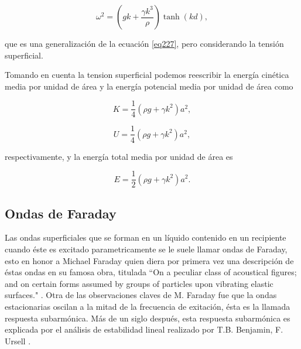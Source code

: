 \begin{equation}\label{eq255}
    \omega^2 = \left(g k + \frac{\gamma k^3}{\rho}\right) \tanh(kd),
\end{equation}

\noindent que es una generalización de la ecuación \ref{eq227}, pero considerando la tensión superficial.

Tomando en cuenta la tension superficial podemos reescribir la energía cinética media por unidad de área y la energía potencial media por unidad de área como

\begin{equation}\label{eq256}
   K = \frac{1}{4} (\rho g + \gamma k^2)a^2,
\end{equation}

\begin{equation}\label{eq257}
   U = \frac{1}{4} (\rho g + \gamma k^2)a^2,
\end{equation}

\noindent respectivamente, y la energía total media por unidad de área es 

\begin{equation}
   E = \frac{1}{2} (\rho g + \gamma k^2)a^2. \label{eq258}
\end{equation}



\subsection{Ondas de Faraday}


Las ondas superficiales que se forman en un líquido contenido en un recipiente cuando éste es excitado parametricamente se le suele llamar ondas de Faraday, esto en honor a Michael Faraday quien diera por primera vez una descripción de éstas ondas en su famosa obra, titulada ``On a peculiar class of acoustical figures; and on certain forms assumed by groups of particles upon vibrating elastic surfaces." \cite{Faraday1831a}. Otra de las observaciones claves de M. Faraday fue que la ondas estacionarias oscilan a la mitad de la frecuencia de exitación, ésta es la llamada respuesta subarmónica. Más de un siglo después, esta respuesta subarmónica es explicada por el análisis de estabilidad lineal realizado por T.B. Benjamin, F. Ursell \cite{benjamin1954stability}.

